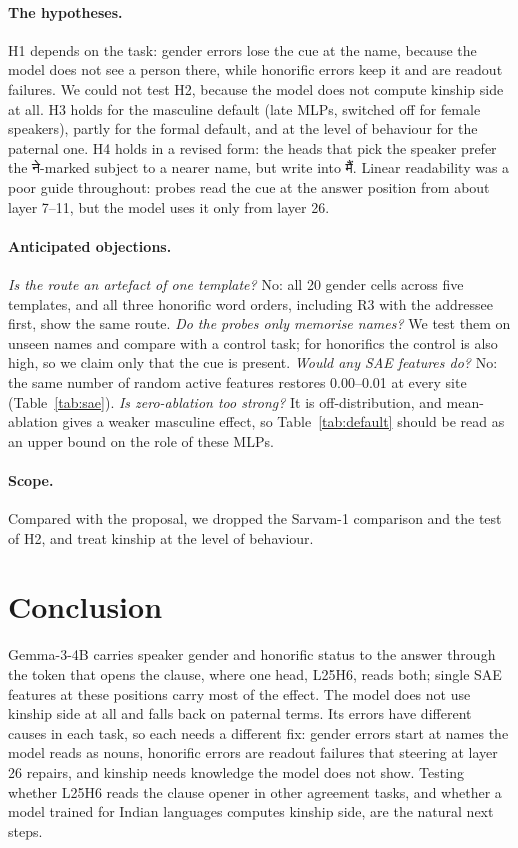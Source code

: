 \documentclass[11pt]{article}
\newcommand{\hi}[1]{{\devfont #1}}
\newcommand{\main}{\hi{मैं}}  %
\begin{document}
\paragraph{The hypotheses.} H1 depends on the task: gender errors lose the cue at the name, because the model does not see a person there, while honorific errors keep it and are readout failures. We could not test H2, because the model does not compute kinship side at all. H3 holds for the masculine default (late MLPs, switched off for female speakers), partly for the formal default, and at the level of behaviour for the paternal one. H4 holds in a revised form: the heads that pick the speaker prefer the \hi{ने}-marked subject to a nearer name, but write into \main{}. Linear readability was a poor guide throughout: probes read the cue at the answer position from about layer 7--11, but the model uses it only from layer 26.

\paragraph{Anticipated objections.} \emph{Is the route an artefact of one template?} No: all 20 gender cells across five templates, and all three honorific word orders, including R3 with the addressee first, show the same route. \emph{Do the probes only memorise names?} We test them on unseen names and compare with a control task; for honorifics the control is also high, so we claim only that the cue is present. \emph{Would any SAE features do?} No: the same number of random active features restores 0.00--0.01 at every site (Table~\ref{tab:sae}). \emph{Is zero-ablation too strong?} It is off-distribution, and mean-ablation gives a weaker masculine effect, so Table~\ref{tab:default} should be read as an upper bound on the role of these MLPs.

\paragraph{Scope.} Compared with the proposal, we dropped the Sarvam-1 comparison and the test of H2, and treat kinship at the level of behaviour.

\section{Conclusion}

Gemma-3-4B carries speaker gender and honorific status to the answer through the token that opens the clause, where one head, L25H6, reads both; single SAE features at these positions carry most of the effect. The model does not use kinship side at all and falls back on paternal terms. Its errors have different causes in each task, so each needs a different fix: gender errors start at names the model reads as nouns, honorific errors are readout failures that steering at layer 26 repairs, and kinship needs knowledge the model does not show. Testing whether L25H6 reads the clause opener in other agreement tasks, and whether a model trained for Indian languages computes kinship side, are the natural next steps.
\end{document}

